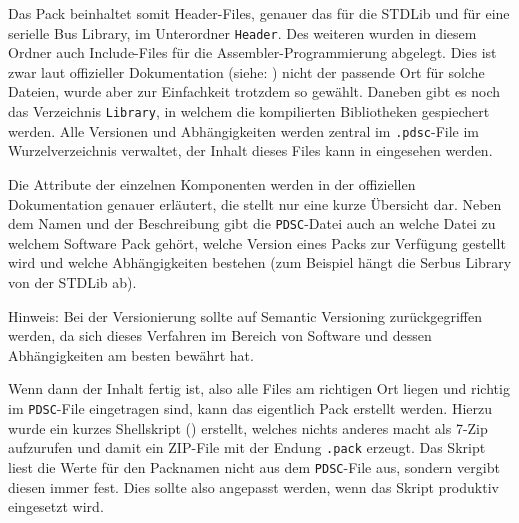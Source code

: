 Das Pack beinhaltet somit Header-Files, genauer das für die \gls{STDLib} und für eine serielle Bus Library, im Unterordner \texttt{Header}. Des weiteren wurden in diesem Ordner auch Include-Files für die Assembler-Programmierung abgelegt. Dies ist zwar laut offizieller Dokumentation (siehe: \cite{arm:CMSISPack}) nicht der passende Ort für solche Dateien, wurde aber zur Einfachkeit trotzdem so gewählt. Daneben gibt es noch das Verzeichnis \texttt{Library}, in welchem die kompilierten Bibliotheken gespiechert werden. Alle Versionen und Abhängigkeiten werden zentral im \texttt{.pdsc}-File im Wurzelverzeichnis verwaltet, der Inhalt dieses Files kann in  eingesehen werden.

\FloatBarrier


Die Attribute der einzelnen Komponenten werden in der offiziellen Dokumentation genauer erläutert, die  stellt nur eine kurze Übersicht dar. Neben dem Namen und der Beschreibung gibt die \texttt{PDSC}-Datei auch an welche Datei zu welchem Software Pack gehört, welche Version eines Packs zur Verfügung gestellt wird und welche Abhängigkeiten bestehen (zum Beispiel hängt die Serbus Library von der \gls{STDLib} ab).


\begin{warning}
    Hinweis: Bei der Versionierung sollte auf \gls{Semantic Versioning} zurückgegriffen werden, da sich dieses Verfahren im Bereich von Software und dessen Abhängigkeiten am besten bewährt hat.
\end{warning}

\label{sec:cmsis-erstellung}

Wenn dann der Inhalt fertig ist, also alle Files am richtigen Ort liegen und richtig im \texttt{PDSC}-File eingetragen sind, kann das eigentlich Pack erstellt werden. Hierzu wurde ein kurzes Shellskript () erstellt, welches nichts anderes macht als 7-Zip aufzurufen und damit ein \gls{ZIP}-File mit der Endung \texttt{.pack} erzeugt. Das Skript liest die Werte für den Packnamen nicht aus dem \texttt{PDSC}-File aus, sondern vergibt diesen immer fest. Dies sollte also angepasst werden, wenn das Skript produktiv eingesetzt wird.

